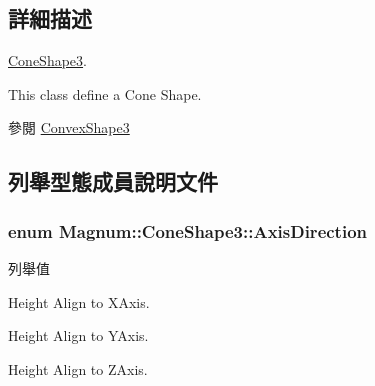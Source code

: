 \subsection{詳細描述}
\hyperlink{class_magnum_1_1_cone_shape3}{Cone\+Shape3}. 

This class define a Cone Shape. \begin{DoxySeeAlso}{參閱}
\hyperlink{class_magnum_1_1_convex_shape3}{Convex\+Shape3} 
\end{DoxySeeAlso}


\subsection{列舉型態成員說明文件}
\subsubsection[{\texorpdfstring{Axis\+Direction}{AxisDirection}}]{\setlength{\rightskip}{0pt plus 5cm}enum {\bf Magnum\+::\+Cone\+Shape3\+::\+Axis\+Direction}}\hypertarget{class_magnum_1_1_cone_shape3_a7c6d6ac946d54755b7e7a64217e07ea3}{}\label{class_magnum_1_1_cone_shape3_a7c6d6ac946d54755b7e7a64217e07ea3}
\begin{Desc}
\item[列舉值]\par
\begin{description}
\item[{\em 
X\+\_\+\+A\+X\+IS\hypertarget{class_magnum_1_1_cone_shape3_a7c6d6ac946d54755b7e7a64217e07ea3a7285be4c5568c9e27fa441b57e246bb6}{}\label{class_magnum_1_1_cone_shape3_a7c6d6ac946d54755b7e7a64217e07ea3a7285be4c5568c9e27fa441b57e246bb6}
}]Height Align to X\+Axis. \item[{\em 
Y\+\_\+\+A\+X\+IS\hypertarget{class_magnum_1_1_cone_shape3_a7c6d6ac946d54755b7e7a64217e07ea3a6e3e3251bee4f380ecbaa6a42c2277a0}{}\label{class_magnum_1_1_cone_shape3_a7c6d6ac946d54755b7e7a64217e07ea3a6e3e3251bee4f380ecbaa6a42c2277a0}
}]Height Align to Y\+Axis. \item[{\em 
Z\+\_\+\+A\+X\+IS\hypertarget{class_magnum_1_1_cone_shape3_a7c6d6ac946d54755b7e7a64217e07ea3afcbc13f75392727a208fa736b3a149ad}{}\label{class_magnum_1_1_cone_shape3_a7c6d6ac946d54755b7e7a64217e07ea3afcbc13f75392727a208fa736b3a149ad}
}]Height Align to Z\+Axis. \end{description}
\end{Desc}


